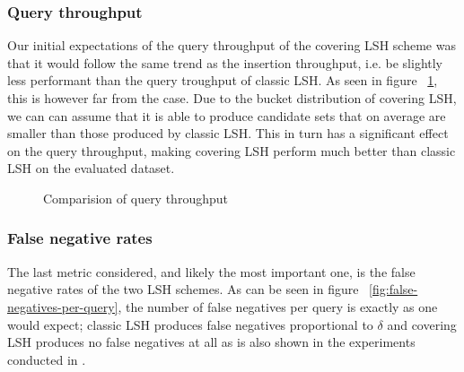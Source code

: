 \subsubsection{Query throughput}

Our initial expectations of the query throughput of the covering LSH scheme was that it would follow the same trend as the insertion throughput, i.e. be slightly less performant than the query troughput of classic LSH. As seen in figure ~\ref{fig:queries-per-second}, this is however far from the case. Due to the bucket distribution of covering LSH, we can can assume that it is able to produce candidate sets that on average are smaller than those produced by classic LSH. This in turn has a significant effect on the query throughput, making covering LSH perform much better than classic LSH on the evaluated dataset.

\begin{figure}[ht]
  \centering

  \caption{Comparision of query throughput}
  \label{fig:queries-per-second}
\end{figure}

\subsubsection{False negative rates}

The last metric considered, and likely the most important one, is the false negative rates of the two LSH schemes. As can be seen in figure ~\ref{fig:false-negatives-per-query}, the number of false negatives per query is exactly as one would expect; classic LSH produces false negatives proportional to $\delta$ and covering LSH produces no false negatives at all as is also shown in the experiments conducted in \cite{DBLP:journals/corr/PhamP16}.

